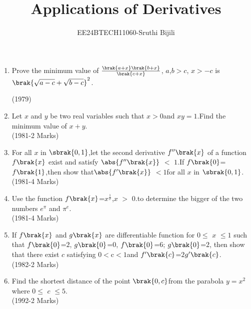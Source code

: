 \documentclass[journal,12pt,twocolumn]{IEEEtran}
\theoremstyle{remark}
\begin{document}

\vspace{3cm}
\title{Applications of Derivatives}
\author{EE24BTECH11060-Sruthi Bijili}
\maketitle

\bigskip
\renewcommand{\thefigure}{\theenumi}
\renewcommand{\thetable}{\theenumi}
\begin{enumerate}
\item  Prove the minimum value of $\frac{\brak{a+x}\brak{b+x}}{\brak{c+x}}$,
$a$,$b$$>$$c$, $x$$>$$-c$ is ${\brak{\sqrt{a-c}+\sqrt{b-c}}}^2$. 
           
\hfill{(1979})


\item  Let $x$ and $y$ be two real variables such that $x$$>$$0$and $xy=1$.Find the minimum value of $x+y$.\\

\hfill{(1981-2 Marks)}

\item  For all $x$ in $\sbrak{0,1}$,let the second derivative $f^{\prime\prime}\brak{x}$ of a function $f\brak{x}$ exist and satisfy $\abs{f^{\prime\prime}\brak{x}}$ $<$ $1$.If $f\brak{0}$=$f\brak{1}$,then show that$\abs{ f^{\prime}\brak{x}}$ $<$$1$for all $x$ in $\sbrak{0,1}$.\\

\hfill{(1981-4 Marks)}

\item  Use the function $f\brak{x}$=$x^\frac{1}{x}$,$x$ $>$ $0$.to determine the bigger of the two numbers $e^\pi$ and $\pi^e$.\\

\hfill{(1981-4 Marks)}

\item  If $f\brak{x}$ and $g\brak{x}$ are differentiable function for $0$$\leq$ $x$ $\leq$$1$ such that $f\brak{0}$=$2$, $g\brak{0}$=$0$, $f\brak{0}$=$6$; $g\brak{0}$=$2$, then show that there exist $c$ satisfying $0$$<$c$<$$1$and $f^{\prime}\brak{c}$=$2$$g^{\prime}\brak{c}$.\\

\hfill{(1982-2 Marks)}

\item  Find the shortest distance of the point $\brak{0,c}$from the parabola $y=x^2$ where $0$$\leq$ $c$ $\leq$$5$.\\

\hfill{(1992-2 Marks)}


\end{enumerate}
\end{document}

